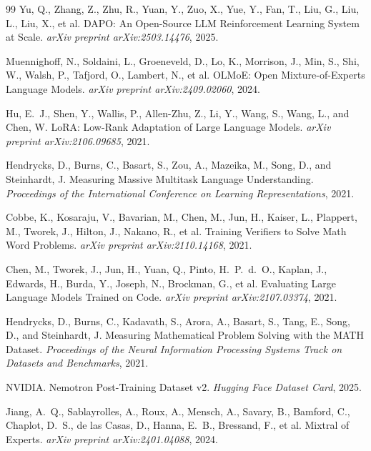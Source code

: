 \documentclass{article}
\begin{document}
\begin{thebibliography}{99}
Yu, Q., Zhang, Z., Zhu, R., Yuan, Y., Zuo, X., Yue, Y., Fan, T., Liu, G., Liu, L., Liu, X., et al.
\newblock DAPO: An Open-Source LLM Reinforcement Learning System at Scale.
\newblock \emph{arXiv preprint arXiv:2503.14476}, 2025.

Muennighoff, N., Soldaini, L., Groeneveld, D., Lo, K., Morrison, J., Min, S., Shi, W., Walsh, P., Tafjord, O., Lambert, N., et al.
\newblock OLMoE: Open Mixture-of-Experts Language Models.
\newblock \emph{arXiv preprint arXiv:2409.02060}, 2024.

Hu, E.~J., Shen, Y., Wallis, P., Allen-Zhu, Z., Li, Y., Wang, S., Wang, L., and Chen, W.
\newblock LoRA: Low-Rank Adaptation of Large Language Models.
\newblock \emph{arXiv preprint arXiv:2106.09685}, 2021.

Hendrycks, D., Burns, C., Basart, S., Zou, A., Mazeika, M., Song, D., and Steinhardt, J.
\newblock Measuring Massive Multitask Language Understanding.
\newblock \emph{Proceedings of the International Conference on Learning Representations}, 2021.

Cobbe, K., Kosaraju, V., Bavarian, M., Chen, M., Jun, H., Kaiser, L., Plappert, M., Tworek, J., Hilton, J., Nakano, R., et al.
\newblock Training Verifiers to Solve Math Word Problems.
\newblock \emph{arXiv preprint arXiv:2110.14168}, 2021.

Chen, M., Tworek, J., Jun, H., Yuan, Q., Pinto, H.~P.~d.~O., Kaplan, J., Edwards, H., Burda, Y., Joseph, N., Brockman, G., et al.
\newblock Evaluating Large Language Models Trained on Code.
\newblock \emph{arXiv preprint arXiv:2107.03374}, 2021.

Hendrycks, D., Burns, C., Kadavath, S., Arora, A., Basart, S., Tang, E., Song, D., and Steinhardt, J.
\newblock Measuring Mathematical Problem Solving with the MATH Dataset.
\newblock \emph{Proceedings of the Neural Information Processing Systems Track on Datasets and Benchmarks}, 2021.

NVIDIA.
\newblock Nemotron Post-Training Dataset v2.
\newblock \emph{Hugging Face Dataset Card}, 2025.

Jiang, A.~Q., Sablayrolles, A., Roux, A., Mensch, A., Savary, B., Bamford, C., Chaplot, D.~S., de las Casas, D., Hanna, E.~B., Bressand, F., et al.
\newblock Mixtral of Experts.
\newblock \emph{arXiv preprint arXiv:2401.04088}, 2024.

\end{thebibliography}
\end{document}
